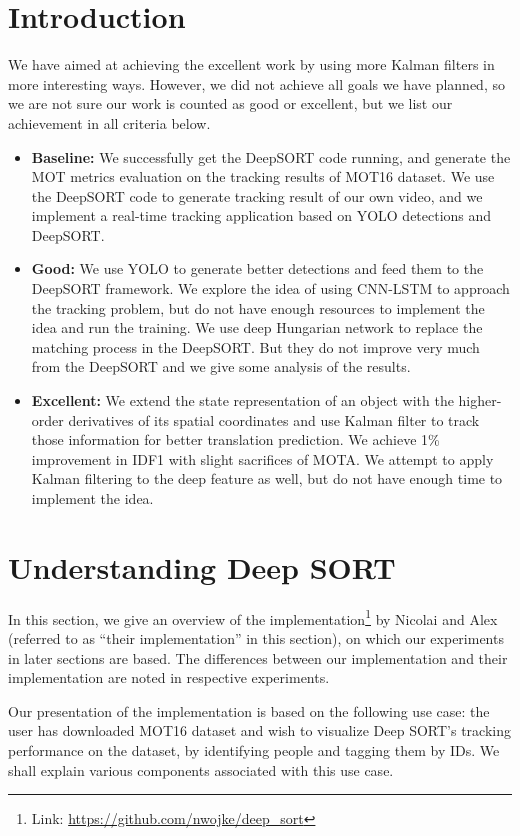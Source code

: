 \documentclass[conference]{IEEEtran}
\begin{document}
\section{Introduction}
We have aimed at achieving the excellent work by using more Kalman filters in more interesting ways.
However, we did not achieve all goals we have planned, so we are not sure our work is counted as good or excellent, but we list our achievement in all criteria below.
\begin{itemize}
    \item \textbf{Baseline:} We successfully get the DeepSORT code running, and generate the MOT metrics evaluation on the tracking results of MOT16 dataset. We use the DeepSORT code to generate tracking result of our own video, and we implement a real-time tracking application based on YOLO detections and DeepSORT.
    \item \textbf{Good:} We use YOLO \cite{redmon2016you}\cite{yolov3} to generate better detections and feed them to the DeepSORT framework. We explore the idea of using CNN-LSTM to approach the tracking problem, but do not have enough resources to implement the idea and run the training. We use deep Hungarian network \cite{xu2019deepmot} to replace the matching process in the DeepSORT. But they do not improve very much from the DeepSORT and we give some analysis of the results.
    \item \textbf{Excellent:} We extend the state representation of an object with the higher-order derivatives of its spatial coordinates and use Kalman filter to track those information for better translation prediction. We achieve 1\% improvement in IDF1 with slight sacrifices of MOTA. We attempt to apply Kalman filtering to the deep feature as well, but do not have enough time to implement the idea.
\end{itemize}

\section{Understanding Deep SORT}

In this section, we give an overview of the implementation\footnote{Link: \url{https://github.com/nwojke/deep_sort}} by Nicolai and Alex \cite{Wojke2018deep} (referred to as ``their implementation'' in this section), on which our experiments in later sections are based. The differences between our implementation and their implementation are noted in respective experiments.

Our presentation of the implementation is based on the following use case: the user has downloaded MOT16 \cite{milan2016mot16} dataset and wish to visualize Deep SORT's tracking performance on the dataset, by identifying people and tagging them by IDs. We shall explain various components associated with this use case.
\end{document}
